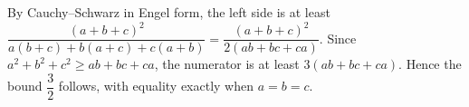 By Cauchy--Schwarz in Engel form, the left side is at least $\dfrac{(a+b+c)^2}{a(b+c)+b(a+c)+c(a+b)}=\dfrac{(a+b+c)^2}{2(ab+bc+ca)}$. Since $ a^2+b^2+c^2\ge ab+bc+ca $, the numerator is at least $ 3(ab+bc+ca)$. Hence the bound $\dfrac{3}{2}$ follows, with equality exactly when $ a=b=c $.
